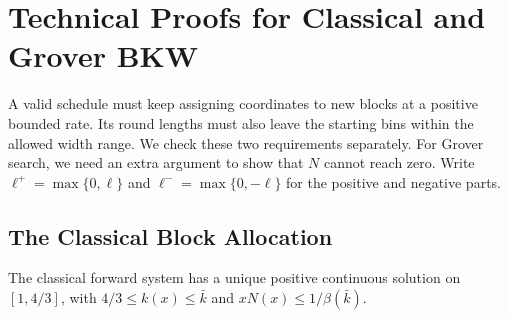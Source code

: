 \documentclass[runningheads,envcountsame,envcountsect,orivec]{llncs}
\begin{document}
\FloatBarrier

\section{Technical Proofs for Classical and Grover BKW}
\label{app:classical-grover-details}

A valid schedule must keep assigning coordinates to new blocks
at a positive bounded rate. Its round lengths must also leave
the starting bins within the allowed width range. We check these
two requirements separately. For Grover search, we need an extra
argument to show that $N$ cannot reach zero.
Write $\ell^+=\max\{0,\ell\}$ and
$\ell^-=\max\{0,-\ell\}$ for the positive and negative parts.

\subsection{The Classical Block Allocation}

\begin{lemma}
\label{lem:c-forward-profile}
The classical forward system has a unique positive continuous
solution on $[1,4/3]$, with
$4/3\le k(x)\le\bar k$ and
$xN(x)\le1/\beta(\bar k)$.
\end{lemma}
\end{document}

